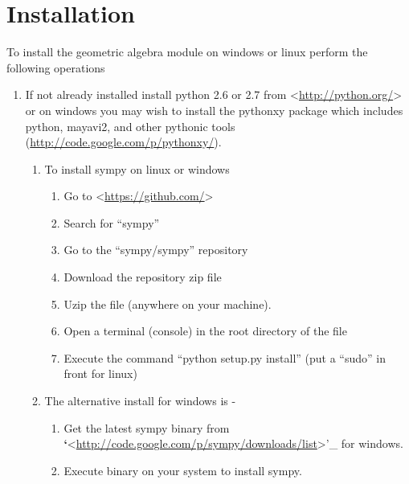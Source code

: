 \documentclass[letterpaper,10pt,english]{sphinxmanual}
\begin{document}
\chapter{Installation}
\label{GA:installation}
To install the geometric algebra module on windows or linux perform the following operations
\begin{enumerate}
\item {} 
If not already installed install python 2.6 or 2.7 from \textless{}\href{http://python.org/}{http://python.org/}\textgreater{} or on windows
you may wish to install the pythonxy package which includes python, mayavi2, and other pythonic
tools (\href{http://code.google.com/p/pythonxy/}{http://code.google.com/p/pythonxy/}).
\begin{enumerate}
\item {} 
To install sympy on linux or windows
\begin{enumerate}
\item {} 
Go to \textless{}\href{https://github.com/}{https://github.com/}\textgreater{}

\item {} 
Search for ``sympy''

\item {} 
Go to the ``sympy/sympy'' repository

\item {} 
Download the repository zip file

\item {} 
Uzip the file (anywhere on your machine).

\item {} 
Open a terminal (console) in the root directory of the file

\item {} 
Execute the command ``python setup.py install'' (put a ``sudo'' in front for linux)

\end{enumerate}

\item {} 
The alternative install for windows is -
\begin{enumerate}
\item {} 
Get the latest sympy binary from {\color{red}\bfseries{}{}`}\textless{}\href{http://code.google.com/p/sympy/downloads/list}{http://code.google.com/p/sympy/downloads/list}\textgreater{}'\_ for windows.

\item {} 
Execute binary on your system to install sympy.


\end{enumerate}
\end{enumerate}
\end{enumerate}
\end{document}
